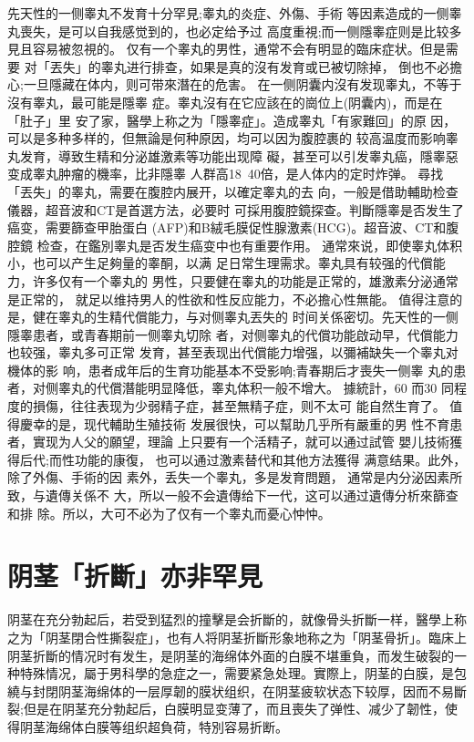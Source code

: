 \documentclass[12pt,UTF8]{ctexbook}
\begin{document}
先天性的一侧睾丸不发育十分罕見;睾丸的炎症、外傷、手術
等因素造成的一侧睾丸喪失，是可以自我感觉到的，也必定给予过
高度重視;而一侧隱睾症则是比较多見且容易被忽視的。
仅有一个睾丸的男性，通常不会有明显的臨床症状。但是需要
对「丟失」的睾丸进行排查，如果是真的沒有发育或已被切除掉，
倒也不必擔心;一旦隱藏在体内，则可带來潛在的危害。
在一侧阴囊内沒有发现睾丸，不等于沒有睾丸，最可能是隱睾
症。睾丸沒有在它应該在的崗位上(阴囊内)，而是在「肚子」里
安了家，醫學上称之为「隱睾症」。造成睾丸「有家難回」的原
因，可以是多种多样的，但無論是何种原因，均可以因为腹腔裹的
较高温度而影响睾丸发育，導致生精和分泌雄激素等功能出现障
礙，甚至可以引发睾丸癌，隱睾惡变成睾丸肿瘤的機率，比非隱睾
人群高18~40倍，是人体内的定时炸弹。
尋找「丟失」的睾丸，需要在腹腔内展开，以確定睾丸的去
向，一般是借助輔助检查儀器，超音波和CT是首選方法，必要时
可採用腹腔鏡探查。判斷隱睾是否发生了癌变，需要篩查甲胎蛋白
(AFP)和B絨毛膜促性腺激素(HCG)。超音波、CT和腹腔鏡
检查，在鑑別睾丸是否发生癌变中也有重要作用。
通常來说，即使睾丸体积小，也可以产生足夠量的睾酮，以满
足日常生理需求。睾丸具有较强的代償能力，许多仅有一个睾丸的
男性，只要健在睾丸的功能是正常的，雄激素分泌通常是正常的，
就足以维持男人的性欲和性反应能力，不必擔心性無能。
值得注意的是，健在睾丸的生精代償能力，与对侧睾丸丟失的
时间关係密切。先天性的一侧隱睾患者，或青春期前一侧睾丸切除
者，对侧睾丸的代償功能啟动早，代償能力也较强，睾丸多可正常
发育，甚至表现出代償能力增强，以彌補缺失一个睾丸对機体的影
响，患者成年后的生育功能基本不受影响;青春期后才喪失一侧睾
丸的患者，对侧睾丸的代償潛能明显降低，睾丸体积一般不增大。
據統計，60%
而30%
同程度的損傷，往往表现为少弱精子症，甚至無精子症，则不太可
能自然生育了。
值得慶幸的是，现代輔助生殖技術
发展很快，可以幫助几乎所有嚴重的男
性不育患者，實现为人父的願望，理論
上只要有一个活精子，就可以通过試管
嬰儿技術獲得后代;而性功能的康復，
也可以通过激素替代和其他方法獲得
满意结果。此外，除了外傷、手術的因
素外，丢失一个睾丸，多是发育問題，
通常是内分泌因素所致，与遺傳关係不
大，所以一般不会遺傳给下一代，这可以通过遺傳分析來篩查和排
除。所以，大可不必为了仅有一个睾丸而憂心忡忡。

\section{阴茎「折斷」亦非罕見}

阴茎在充分勃起后，若受到猛烈的撞擊是会折斷的，就像骨头折斷一样，醫學上称之为「阴茎閉合性撕裂症」，也有人将阴茎折斷形象地称之为「阴茎骨折」。臨床上阴茎折斷的情况时有发生，是阴茎的海绵体外面的白膜不堪重負，而发生破裂的一种特殊情况，屬于男科學的急症之一，需要紧急处理。實際上，阴茎的白膜，是包繞与封閉阴茎海绵体的一层厚韌的膜状组织，在阴茎疲软状态下较厚，因而不易斷裂;但是在阴茎充分勃起后，白膜明显变薄了，而且喪失了弹性、减少了韌性，使得阴茎海绵体白膜等组织超負荷，特別容易折断。
\end{document}
